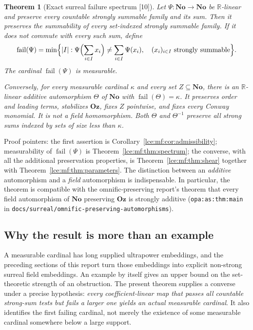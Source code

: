 \documentclass[11pt,letterpaper]{article}
\numberwithin{equation}{section}
\newtheorem{theorem}{Theorem}[section]
\theoremstyle{definition}
\theoremstyle{remark}
\newcommand{\No}{\mathbf{No}}
\newcommand{\Oz}{\mathbf{Oz}}
\newcommand{\R}{\mathbb R}
\newcommand{\abs}[1]{\lvert#1\rvert}
\newcommand{\thref}[1]{Theorem~\ref{#1}}
\newcommand{\src}[1]{\textup{\textsf{\small[#1]}}}%
\newcommand{\lbl}[1]{\nolinkurl{#1}}%
\newcommand{\fn}[1]{\nolinkurl{#1}}%
\newcommand{\fail}{\operatorname{fail}}
\begin{document}
\begin{theorem}[Exact surreal failure spectrum \src{10}]\label{lce:mf:thm:intro}
Let $\Psi:\No\to\No$ be $\R$-linear and preserve every countable strongly
summable family and its sum. Then it preserves the summability of every
set-indexed strongly summable family. If it does not commute with every such
sum, define
\begin{equation}\label{lce:mf:eq:fail}
 \fail(\Psi)=\min\Bigl\{\abs I:
 \Psi\Bigl(\sum_{i\in I}x_i\Bigr)\ne\sum_{i\in I}\Psi(x_i),\quad
 (x_i)_{i\in I}\text{ strongly summable}\Bigr\}.
\end{equation}
The cardinal $\fail(\Psi)$ is measurable.

Conversely, for every measurable cardinal $\kappa$ and every set
$Z\subseteq\No$, there is an $\R$-linear additive automorphism $\Theta$ of
$\No$ with $\fail(\Theta)=\kappa$. It preserves order and leading terms,
stabilizes $\Oz$, fixes $Z$ pointwise, and fixes every Conway monomial. It is
not a field homomorphism. Both $\Theta$ and $\Theta^{-1}$ preserve all strong
sums indexed by sets of size less than $\kappa$.
\end{theorem}
Proof pointers: the first assertion is
Corollary~\ref{lce:mf:cor:admissibility}; measurability of $\fail(\Psi)$ is
\thref{lce:mf:thm:spectrum}; the converse, with all the additional
preservation properties, is \thref{lce:mf:thm:shear} together with
\thref{lce:mf:thm:parameters}. The distinction between an \emph{additive}
automorphism and a \emph{field} automorphism is indispensable. In
particular, the theorem is compatible with the omnific-preserving report's
theorem that every field automorphism of $\No$ preserving $\Oz$ is strongly
additive (\lbl{opa:as:thm:main} in
\fn{docs/surreal/omnific-preserving-automorphisms}).

\subsection{Why the result is more than an example}
A measurable cardinal has long supplied ultrapower embeddings, and the
preceding sections of this report turn those embeddings into explicit
non-strong surreal field embeddings. An example by itself gives an upper
bound on the set-theoretic strength of an obstruction. The present theorem
supplies a converse under a precise hypothesis: \emph{every
coefficient-linear map that passes all countable strong-sum tests but fails a
larger one yields an actual measurable cardinal}. It also identifies the
first failing cardinal, not merely the existence of some measurable cardinal
somewhere below a large support.
\end{document}
